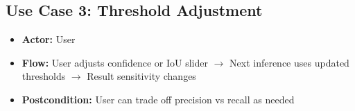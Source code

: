 \subsection{Use Case 3: Threshold Adjustment}
\begin{itemize}
    \item \textbf{Actor:} User
    \item \textbf{Flow:} User adjusts confidence or IoU slider $\rightarrow$ Next inference uses updated thresholds $\rightarrow$ Result sensitivity changes
    \item \textbf{Postcondition:} User can trade off precision vs recall as needed
\end{itemize}
